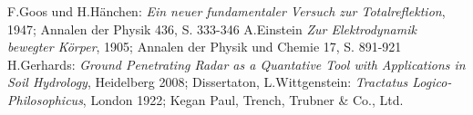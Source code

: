 \documentclass[10pt,twocolumn]{scrartcl}
\begin{document}
\begin{thebibliography}{99}
F.Goos und H.Hänchen: {\it Ein neuer fundamentaler Versuch zur Totalreflektion}, 1947; Annalen der Physik 436, S. 333-346
A.Einstein {\it Zur Elektrodynamik bewegter Körper}, 1905; Annalen der Physik und Chemie 17, S. 891-921
H.Gerhards: {\it Ground Penetrating Radar as a Quantative Tool with Applications in Soil Hydrology}, Heidelberg 2008; Dissertaton,
L.Wittgenstein: {\it Tractatus Logico-Philo\-so\-phi\-cus}, London 1922; Kegan Paul, Trench, Trubner \& Co., Ltd.
\end{thebibliography}
\end{document}
